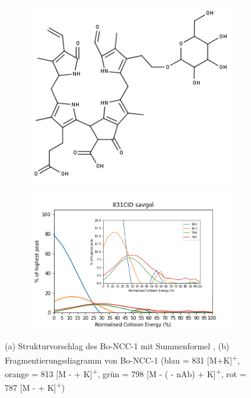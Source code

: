 \begin{figure}[!htbp]
  \begin{subfigure}[b]{0.5\textwidth}
    \includegraphics[width=\textwidth]{figures/Kapitel4/Kataboliten/fragmentation_structures/VWA_Katabolit_831.png}
    \caption{}
    \label{fig:831MKLeafspraystructure}
  \end{subfigure}
  \hfill
  \begin{subfigure}[b]{0.7\textwidth}
    \includegraphics[width=\textwidth]{figures/Kapitel4/Kataboliten/diags/831CID-savgol.png}
    \caption{}
    \label{fig:831MKLeafspraydiags}
  \end{subfigure}
  \caption[Strukturvorschlag von Bo-NCC-1 und Fragmentierungsdiagramm, Quelle: Author]{(a) Strukturvorschlag des Bo-NCC-1 mit Summenformel , (b) Fragmentierungsdiagramm von Bo-NCC-1 (blau = 831 [M+K]\textsuperscript{+}, orange = 813 [M -  + K]\textsuperscript{+}, grün = 798 [M - ( - \gls{nAb}) + K]\textsuperscript{+}, rot = 787 [M -  + K]\textsuperscript{+})}
\end{figure}



